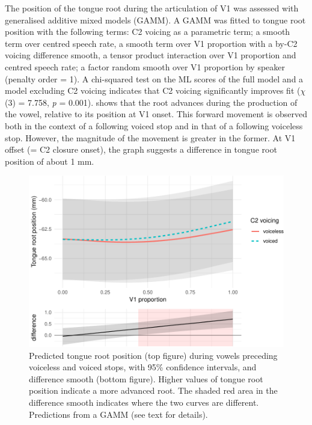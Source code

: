 \documentclass[12pt,]{article}
\begin{document}
\label{s:trp-v1}

The position of the tongue root during the articulation of V1 was
assessed with generalised additive mixed models (GAMM). A GAMM was
fitted to tongue root position with the following terms: C2 voicing as a
parametric term; a smooth term over centred speech rate, a smooth term
over V1 proportion with a by-C2 voicing difference smooth, a tensor
product interaction over V1 proportion and centred speech rate; a factor
random smooth over V1 proportion by speaker (penalty order = 1). A
chi-squared test on the ML scores of the full model and a model
excluding C2 voicing indicates that C2 voicing significantly improves
fit (\(\chi\)(3) = 7.758, \emph{p} = 0.001).  shows
that the root advances during the production of the vowel, relative to
its position at V1 onset. This forward movement is observed both in the
context of a following voiced stop and in that of a following voiceless
stop. However, the magnitude of the movement is greater in the former.
At V1 offset (= C2 closure onset), the graph suggests a difference in
tongue root position of about 1 mm.

\begin{figure}
\includegraphics[width=\linewidth]{2018-tra_files/figure-latex/tra-gam-plot-1} \caption{Predicted tongue root position (top figure) during vowels preceding voiceless and voiced stops, with 95\% confidence intervals, and difference smooth (bottom figure). Higher values of tongue root position indicate a more advanced root. The shaded red area in the difference smooth indicates where the two curves are different. Predictions from a GAMM (see text for details).}\label{f:tra-gam-plot}
\end{figure}
\end{document}
